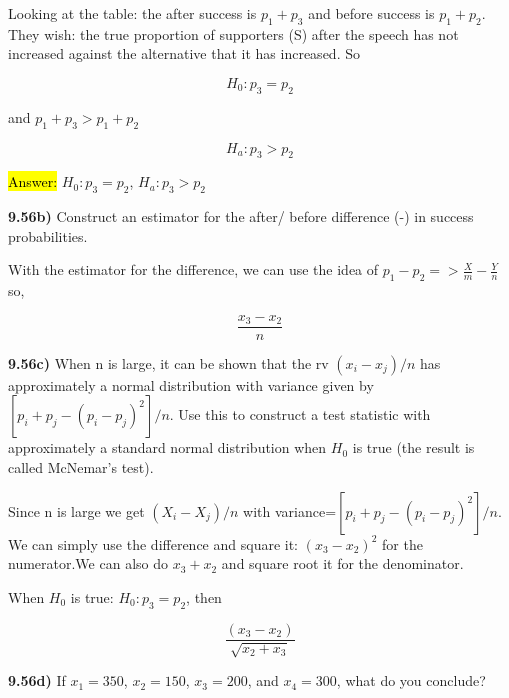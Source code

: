 \documentclass{article}
\begin{document}
\vspace{3mm}

Looking at the table: the after success is $p_{1}+p_{3}$ and before success is $p_{1}+p_{2}$. They wish: the true proportion of supporters (S) after the speech has not increased against the alternative that it has increased. So 


$$H_{0}: p_{3}=p_{2}$$

and $p_{1}+p_{3} > p_{1}+p_{2}$

$$H_{a}: p_{3} > p_{2}$$

 \vspace{2mm}


\hl{Answer:} $H_{0}: p_{3}=p_{2}$, $H_{a}: p_{3} > p_{2}$

\vspace{5mm}

\textbf{9.56b)} Construct an estimator for the after/ before difference (-) in success probabilities.

With the estimator for the difference, we can use the idea of $p_{1}-p_{2} => \frac{X}{m}-\frac{Y}{n}$ so,

$$\frac{x_{3}-x_{2}}{n}$$


\vspace{5mm}

\textbf{9.56c)}  When n is large, it can be shown that the rv $(x_{i}-x_{j})/n$ has approximately a normal distribution with variance given by $[p_{i} + p_{j} - (p_{i} - p_{j})^{2}]/n$. Use this to construct a test statistic with approximately a standard normal distribution when $H_{0}$ is true (the result is called McNemar’s test).

\vspace{3mm}

Since n is large we get $(X_{i}-X_{j})/n$ with variance=$[p_{i} + p_{j} - (p_{i} - p_{j})^{2}]/n$. We can simply use the difference and square it: $(x_{3}-x_{2})^2$ for the numerator.We can also do $x_{3}+x_{2}$ and square root it for the denominator.

\vspace{3mm}

When $H_{0}$ is true: $H_{0}: p_{3}=p_{2}$, then 

$$\frac{(x_{3}-x_{2})}{\sqrt{x_{2}+x_{3}}}$$

\vspace{5mm}


\textbf{9.56d)} If $x_{1}=350$, $x_{2}=150$, $x_{3}=200$, and $x_{4}=300$, what do you conclude?
\end{document}
